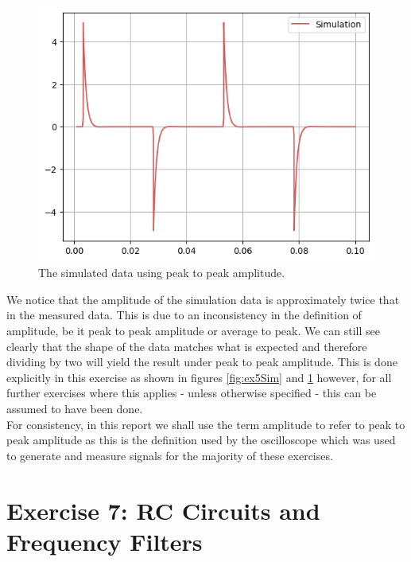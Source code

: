 \documentclass[%
reprint,
amsmath,amssymb,
aps,
floatfix
]{revtex4-2}
\begin{document}
		\begin{figure}
			\includegraphics[width=0.85\columnwidth]{ex5_simPlotAdj.png}
			\caption{\label{fig:ex5SimAdj}The simulated data using peak to peak amplitude.}
		\end{figure}
	
		We notice that the amplitude of the simulation data is approximately twice that in the measured data. This is due to an inconsistency in the definition of amplitude, be it peak to peak amplitude or average to peak. We can still see clearly that the shape of the data matches what is expected and therefore dividing by two will yield the result under peak to peak amplitude. This is done explicitly in this exercise as shown in figures \ref{fig:ex5Sim} and \ref{fig:ex5SimAdj} however, for all further exercises where this applies - unless otherwise specified - this can be assumed to have been done.\\
		
		For consistency, in this report we shall use the term amplitude to refer to peak to peak amplitude as this is the definition used by the oscilloscope which was used to generate and measure signals for the majority of these exercises.
		
	\section{Exercise 7: RC Circuits and Frequency Filters}
\end{document}
